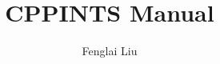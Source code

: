 \documentclass[a4paper,12pt,oneside]{book}
\author{Fenglai Liu}
\title{CPPINTS Manual}
\begin{document}
\maketitle
\tableofcontents

\graphicspath{{figure/}}
\setlength\parindent{0pt}








\end{document}
